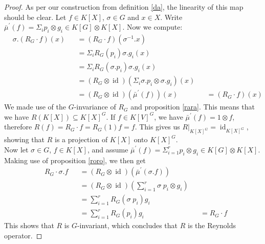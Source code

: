 \begin{proof}
  As per our construction from definition \ref{da}, the linearity of this map should be clear.
  Let $f \in K[X]$, $\sigma \in G$ and $x \in X$.
  Write $\bar{\mu}^\prime (f) = \Sigma_i p_i \otimes g_i \in K[G] \otimes K[X] $.
  Now we compute:
  \begin{equation}
    \begin{aligned}
      &\sigma. \left( R_G \cdot f \right) (x)
      &&= \left( R_G \cdot f \right) (\sigma^{-1}.x)\\
      &&&= \Sigma_i R_G \left( p_i \right)  \sigma.g_i \left(  x \right) \\
      &&&= \Sigma_i R_G (\sigma.p_i)  \sigma.g_i (x)\\
      &&&= \left( R_G \otimes \operatorname{id} \right) \left( \Sigma_i \sigma.p_i \otimes \sigma.g_i \right) (x)\\
      &&&= (R_G \otimes \operatorname{id}) (\bar{\mu}^\prime (f)) (x)
      &&= (R_G \cdot f) (x)
    \end{aligned}
  \end{equation}
  We made use of the $G$-invariance of $R_G$ and proposition \ref{rara}.
  This means that we have $R(K[X]) \subseteq K[X]^G$.
  If $f \in K[V]^G$, we have $\bar{\mu}^\prime (f) = 1 \otimes f$, therefore $R(f) = R_G \cdot f = R_G (1)f = f$.
  This gives us $\left. R \right|_{K[X]^G} = \operatorname{id}_{K[X]^G}$, showing that $R$ is a projection of $K[X]$ onto $K[X]^G$.\\
  Now let $\sigma \in G$, $ f \in K[X]$, and assume $\bar{\mu}^\prime(f) = \Sigma_{i=1}^r p_i \otimes g_i \in K[G] \otimes K[X]$.
  Making use of proposition \ref{roro}, we then get
  \begin{equation}
    \begin{aligned}
      &R_G \cdot \sigma.f
      &&= (R_G \otimes \operatorname{id}) \left(\bar{\mu}^\prime(\sigma.f)\right)\\
      &&&= (R_G \otimes \operatorname{id}) \left(\sum_{i=1}^r \sigma \dot{\phantom{.}}p_i \otimes g_i \right)\\
      &&&= \sum_{i=1}^r R_G(\sigma\dot{\phantom{.}}p_i)g_i\\
      &&&= \sum_{i=1}^r R_G(p_i)g_i
      &&= R_G \cdot f
    \end{aligned}
  \end{equation}
This shows that $R$ is $G$-invariant, which concludes that $R$ is the Reynolds operator.
\end{proof}

